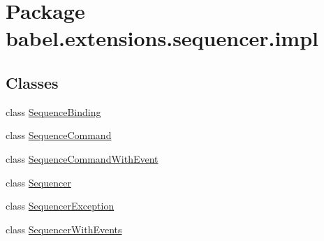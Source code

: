 \hypertarget{namespacebabel_1_1extensions_1_1sequencer_1_1impl}{\section{Package babel.\-extensions.\-sequencer.\-impl}
\label{namespacebabel_1_1extensions_1_1sequencer_1_1impl}
}
\subsection*{Classes}
\begin{DoxyCompactItemize}
\item 
class \hyperlink{classbabel_1_1extensions_1_1sequencer_1_1impl_1_1_sequence_binding}{Sequence\-Binding}
\item 
class \hyperlink{classbabel_1_1extensions_1_1sequencer_1_1impl_1_1_sequence_command}{Sequence\-Command}
\item 
class \hyperlink{classbabel_1_1extensions_1_1sequencer_1_1impl_1_1_sequence_command_with_event}{Sequence\-Command\-With\-Event}
\item 
class \hyperlink{classbabel_1_1extensions_1_1sequencer_1_1impl_1_1_sequencer}{Sequencer}
\item 
class \hyperlink{classbabel_1_1extensions_1_1sequencer_1_1impl_1_1_sequencer_exception}{Sequencer\-Exception}
\item 
class \hyperlink{classbabel_1_1extensions_1_1sequencer_1_1impl_1_1_sequencer_with_events}{Sequencer\-With\-Events}
\end{DoxyCompactItemize}
